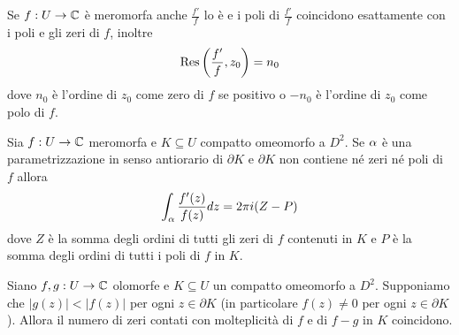 \begin{multicols*}{2}
\begin{proposition}\label{ResiduoDellaDerivataLogaritmicaEOrdine}
Se $f:U\to \mathbb{C}$ \`e meromorfa anche $\frac{f'}{f}$ lo \`e e i poli di $\frac{f'}{f}$ coincidono esattamente con i poli e gli zeri di $f$, inoltre
\[\mathrm{Res}\left(\frac{f'}f,z_0\right)=n_0\]
dove $n_0$ \`e l'ordine di $z_0$ come zero di $f$ se positivo o $-n_0$ \`e l'ordine di $z_0$ come polo di $f$.
\end{proposition}

\begin{theorem}\label{TeoremaDerivataLogaritmica}
Sia $f:U\to \mathbb{C}$ meromorfa e $K\subseteq U$ compatto omeomorfo a $D^2$. Se $\alpha$ \`e una parametrizzazione in senso antiorario di $\partial K$ e $\partial K$ non contiene n\'e zeri n\'e poli di $f$ allora
\[\int_\alpha\frac{f'(z)}{f(z)}dz=2\pi i(Z-P)\]
dove $Z$ \`e la somma degli ordini di tutti gli zeri di $f$ contenuti in $K$ e $P$ \`e la somma degli ordini di tutti i poli di $f$ in $K$.
\end{theorem}

\begin{corollary}\label{TeoremaDiRouche}
Siano $f,g:U\to\mathbb{C}$ olomorfe e  $K\subseteq U$ un compatto omeomorfo a $D^2$. Supponiamo che $|g(z)|<|f(z)|$ per ogni $z\in\partial K$ (in particolare $f(z)\neq 0$ per ogni $z\in\partial K$). Allora il numero di zeri contati con molteplicit\`a di $f$ e di $f-g$ in $K$ coincidono.
\end{corollary}

\end{multicols*}
